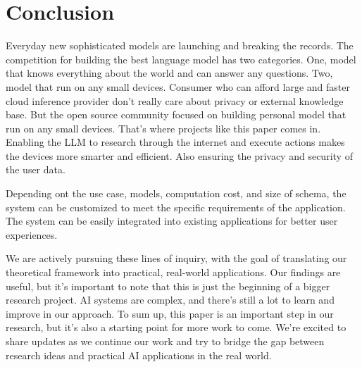 \documentclass[conference]{IEEEtran}
\begin{document}



\section{Conclusion}
Everyday new sophisticated models are launching and breaking the records. The competition for building the best language model has two categories. One, model that knows everything about the world and can answer any questions. Two, model that run on any small devices. Consumer who can afford large and faster cloud inference provider don't really care about privacy or external knowledge base. But the open source community focused on building personal model that run on any small devices. That's where projects like this paper comes in. Enabling the LLM to research through the internet and execute actions makes the devices more smarter and efficient. Also ensuring the privacy and security of the user data.

Depending ont the use case, models, computation cost, and size of schema, the system can be customized to meet the specific requirements of the application. The system can be easily integrated into existing applications for better user experiences. 

We are actively pursuing these lines of inquiry, with the goal of translating our theoretical framework into practical, real-world applications. Our findings are useful, but it's important to note that this is just the beginning of a bigger research project. AI systems are complex, and there's still a lot to learn and improve in our approach. To sum up, this paper is an important step in our research, but it's also a starting point for more work to come. We're excited to share updates as we continue our work and try to bridge the gap between research ideas and practical AI applications in the real world.
\end{document}
